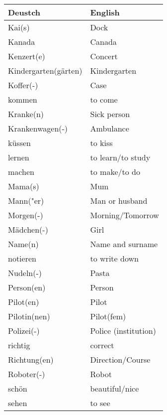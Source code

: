 \documentclass{article}
\renewcommand{\arraystretch}{1}
\begin{document}
\hfill
\begin{minipage}{0.48\textwidth}
    \centering
    \renewcommand{\arraystretch}{1.5}
    \begin{tabular}{|>{\raggedright\arraybackslash}p{3.5cm}|>{\raggedright\arraybackslash}p{3.5cm}|}
        \hline
        \rowcolor{gray!20} \textbf{Deustch} & \textbf{English} \\
        \hline
        Kai(s) & Dock \\\hline
        Kanada & Canada \\\hline
        Kenzert(e) & Concert \\\hline
        Kindergarten(gärten) & Kindergarten \\\hline
        Koffer(-) & Case \\\hline
        kommen & to come \\\hline
        Kranke(n) & Sick person \\\hline
        Krankenwagen(-) & Ambulance \\\hline
        küssen & to kiss \\\hline
        lernen & to learn/to study \\\hline
        machen &  to make/to do \\\hline
        Mama(s) & Mum \\\hline
        Mann("er) & Man or husband \\\hline
        Morgen(-) & Morning/Tomorrow \\\hline
        Mädchen(-) & Girl \\\hline
        Name(n) & Name and surname \\\hline
        notieren & to write down \\\hline
        Nudeln(-) & Pasta \\\hline
        Person(en) & Person \\\hline
        Pilot(en) & Pilot \\\hline
        Pilotin(nen) & Pilot(fem) \\\hline
        Polizei(-) & Police (institution) \\\hline
        richtig & correct \\\hline
        Richtung(en) & Direction/Course \\\hline
        Roboter(-) & Robot \\\hline
        schön & beautiful/nice \\\hline
        sehen & to see \\\hline
    \end{tabular}
\end{minipage}
\end{document}
